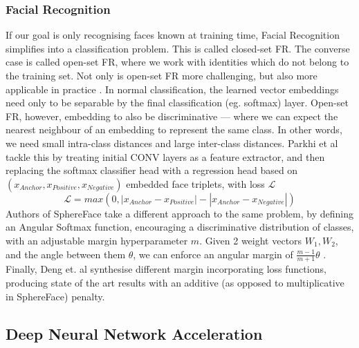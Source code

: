 \documentclass[12pt]{article}
\newcommand{\Loss}{\mathcal{L}}
\begin{document}
\subsubsection{Facial Recognition}
If our goal is only recognising faces known at training time, Facial Recognition simplifies
into a classification problem. This is called closed-set FR.
The converse case is called open-set FR, where we work with identities which do not belong to
the training set.
Not only is open-set FR more challenging, but also more applicable in practice
\cite{liu2017sphereface}.
In normal classification, the learned vector embeddings need only to be separable by the final
classification (eg. softmax) layer.
Open-set FR, however, embedding to also be discriminative --- where we can expect the nearest
neighbour of an embedding to represent the same class. In other words, we need small intra-class
distances and large inter-class distances\cite{deng2019arcface}.
Parkhi et al\cite{parkhi2015deep} tackle this by treating initial CONV layers as a feature
extractor, and then replacing the softmax classifier head with a regression head based on
$(x_{Anchor}, x_{Positive}, x_{Negative})$ embedded face triplets, with loss $\Loss$ $$\Loss =
max(0, |x_{Anchor} - x_{Positive}| - |x_{Anchor} - x_{Negative}|)$$
Authors of SphereFace\cite{liu2017sphereface} take a different approach to the same problem,
by defining an Angular Softmax function, encouraging a discriminative distribution of classes,
with an adjustable margin hyperparameter $m$.
Given 2 weight vectors $W_1, W_2$, and the angle between them $\theta$, we can enforce an
angular margin of $\frac{m-1}{m+1}\theta$ \cite{li2018angular}.
Finally, Deng et. al synthesise different margin incorporating loss functions, producing
state of the art results with an additive (as opposed to multiplicative in SphereFace)
penalty\cite{deng2019arcface}.

\subsection{Deep Neural Network Acceleration}
\end{document}
